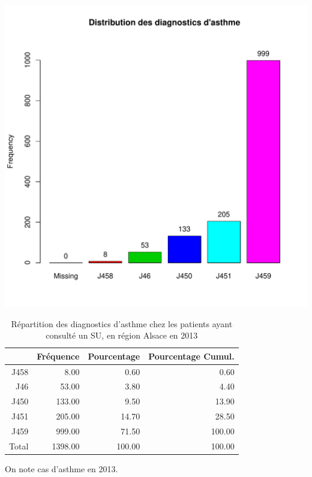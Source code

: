 \documentclass[12pt,english,french,twoside]{book}\usepackage[]{graphicx}\usepackage[]{color}
\makeatletter
\def\maxwidth{ %
  \ifdim\Gin@nat@width>\linewidth
    \linewidth
  \else
    \Gin@nat@width
  \fi
}
\makeatother
\begin{document}
\includegraphics[width=\maxwidth]{figure/asthme} 
\begin{table}[ht]
\centering
\begin{tabular}{rrrr}
  \hline
 & Fréquence & Pourcentage & Pourcentage Cumul. \\ 
  \hline
J458 & 8.00 & 0.60 & 0.60 \\ 
  J46 & 53.00 & 3.80 & 4.40 \\ 
  J450 & 133.00 & 9.50 & 13.90 \\ 
  J451 & 205.00 & 14.70 & 28.50 \\ 
  J459 & 999.00 & 71.50 & 100.00 \\ 
    Total & 1398.00 & 100.00 & 100.00 \\ 
   \hline
\end{tabular}
\caption[Répartition des diagnostics d'asthme]{Répartition des diagnostics d'asthme chez les patients ayant consulté un  SU, en région Alsace en 2013} 
\label{tab:asthme}
\end{table}



On note  cas d'asthme en 2013.
\end{document}
